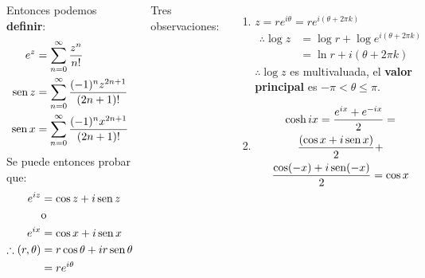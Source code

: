 \documentclass[9pt, aspectratio=169]{beamer}
\begin{document}
\begin{frame}
	\begin{columns}[t]
		Entonces podemos \textbf{definir}:
		\begin{align*}
			e^z    & = \sum_{n = 0}^{\infty} \frac{z^n}{n!}                      \\
			\operatorname{sen} z & = \sum_{n = 0}^{\infty} \frac{(-1)^n z^{2 n + 1}}{(2n +1)!} \\
			\operatorname{sen} x & = \sum_{n = 0}^{\infty} \frac{(-1)^n x^{2 n + 1}}{(2n +1)!} \\
		\end{align*}
		Se puede entonces probar que:
		\begin{align*}
			e^{iz}                 & = \cos z + i \operatorname{sen} z               \\
			                       & \text{o}                          \\
			e^{ix}                 & = \cos x + i \operatorname{sen} x               \\
			\therefore (r, \theta) & = r \cos \theta + i r \operatorname{sen} \theta \\
			                       & = r e^{i \theta}
		\end{align*}

		Tres observaciones:
		\begin{enumerate}
			\item $z = r e^{i \theta} = r e^{i(\theta + 2 \pi k)} $
			      \begin{align*}
				      \therefore \log z & = \log r + \log e^{i(\theta + 2 \pi k)} \\
				                        & = \ln r + i (\theta + 2 \pi k)
			      \end{align*}
			      $\therefore \log z$ es multivaluada, el \textbf{valor principal} es $-\pi < \theta \leq \pi$.
			\item
			      \begin{multline*}
				      \cosh i x = \frac{e^{ix} + e^{-ix}}{2} = \\
				      \frac{(\cos x + i \operatorname{sen} x)}{2} + \\
				      \frac{\cos(-x) + i \operatorname{sen}(-x)}{2} = \cos x
			      \end{multline*}
		\end{enumerate}


\end{columns}
\end{frame}
\end{document}
